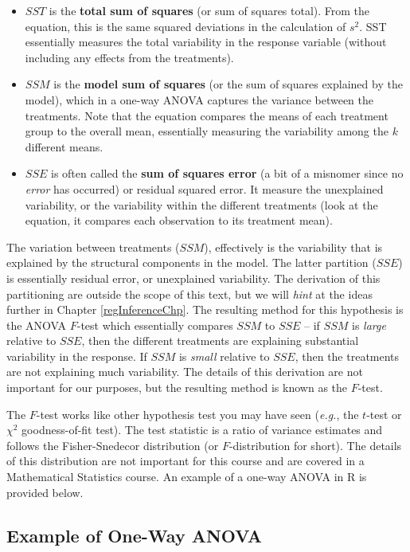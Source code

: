\documentclass[
]{book}
\providecommand{\tightlist}{%
  \setlength{\itemsep}{0pt}\setlength{\parskip}{0pt}}
\begin{document}
\begin{itemize}
\tightlist
\item
  \(SST\) is the \textbf{total sum of squares} (or sum of squares total). From the equation, this is the same squared deviations in the calculation of \(s^2\). SST essentially measures the total variability in the response variable (without including any effects from the treatments).
\item
  \(SSM\) is the \textbf{model sum of squares} (or the sum of squares explained by the model), which in a one-way ANOVA captures the variance between the treatments. Note that the equation compares the means of each treatment group to the overall mean, essentially measuring the variability among the \(k\) different means.
\item
  \(SSE\) is often called the \textbf{sum of squares error} (a bit of a misnomer since no \emph{error} has occurred) or residual squared error. It measure the unexplained variability, or the variability within the different treatments (look at the equation, it compares each observation to its treatment mean).
\end{itemize}

The variation between treatments (\(SSM\)), effectively is the variability that is explained by the structural components in the model.
The latter partition (\(SSE\)) is essentially residual error, or unexplained variability.
The derivation of this partitioning are outside the scope of this text, but we will \emph{hint} at the ideas further in Chapter \ref{regInferenceChp}.
The resulting method for this hypothesis is the ANOVA \(F\)-test which essentially compares \(SSM\) to \(SSE\) -- if \(SSM\) is \emph{large} relative to \(SSE\), then the different treatments are explaining substantial variability in the response. If \(SSM\) is \emph{small} relative to \(SSE\), then the treatments are not explaining much variability.
The details of this derivation are not important for our purposes, but the resulting method is known as the \(F\)-test.

The \(F\)-test works like other hypothesis test you may have seen (\emph{e.g.}, the \(t\)-test or \(\chi^2\) goodness-of-fit test).
The test statistic is a ratio of variance estimates and follows the Fisher-Snedecor distribution (or \(F\)-distribution for short).
The details of this distribution are not important for this course and are covered in a Mathematical Statistics course.
An example of a one-way ANOVA in R is provided below.

\hypertarget{example-of-one-way-anova}{%
\subsection{Example of One-Way ANOVA}\label{example-of-one-way-anova}}
\end{document}
